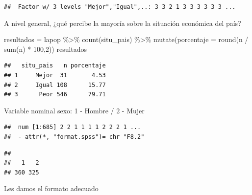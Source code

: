 \documentclass[
]{article}
\newenvironment{Shaded}{\begin{snugshade}}{\end{snugshade}}
\newcommand{\AttributeTok}[1]{\textcolor[rgb]{0.77,0.63,0.00}{#1}}
\newcommand{\DecValTok}[1]{\textcolor[rgb]{0.00,0.00,0.81}{#1}}
\newcommand{\FunctionTok}[1]{\textcolor[rgb]{0.00,0.00,0.00}{#1}}
\newcommand{\NormalTok}[1]{#1}
\newcommand{\OtherTok}[1]{\textcolor[rgb]{0.56,0.35,0.01}{#1}}
\newcommand{\SpecialCharTok}[1]{\textcolor[rgb]{0.00,0.00,0.00}{#1}}
\newcommand{\StringTok}[1]{\textcolor[rgb]{0.31,0.60,0.02}{#1}}
\begin{document}
\begin{verbatim}
##  Factor w/ 3 levels "Mejor","Igual",..: 3 3 2 1 3 3 3 3 3 3 ...
\end{verbatim}

A nivel general, ¿qué percibe la mayoría sobre la situación económica
del país?

\begin{Shaded}
\begin{Highlighting}[]
\NormalTok{resultados }\OtherTok{=}\NormalTok{ lapop }\SpecialCharTok{\%\textgreater{}\%}
  \FunctionTok{count}\NormalTok{(situ\_pais) }\SpecialCharTok{\%\textgreater{}\%}
  \FunctionTok{mutate}\NormalTok{(}\AttributeTok{porcentaje =} \FunctionTok{round}\NormalTok{(n }\SpecialCharTok{/} \FunctionTok{sum}\NormalTok{(n) }\SpecialCharTok{*} \DecValTok{100}\NormalTok{,}\DecValTok{2}\NormalTok{))}
\NormalTok{resultados}
\end{Highlighting}
\end{Shaded}

\begin{verbatim}
##   situ_pais   n porcentaje
## 1     Mejor  31       4.53
## 2     Igual 108      15.77
## 3      Peor 546      79.71
\end{verbatim}

Variable nominal sexo: 1 - Hombre / 2 - Mujer

\begin{Shaded}
\end{Shaded}

\begin{verbatim}
##  num [1:685] 2 2 1 1 1 1 2 2 2 1 ...
##  - attr(*, "format.spss")= chr "F8.2"
\end{verbatim}

\begin{Shaded}
\end{Shaded}

\begin{verbatim}
## 
##   1   2 
## 360 325
\end{verbatim}

Les damos el formato adecuado

\begin{Shaded}
\end{Shaded}
\end{document}
